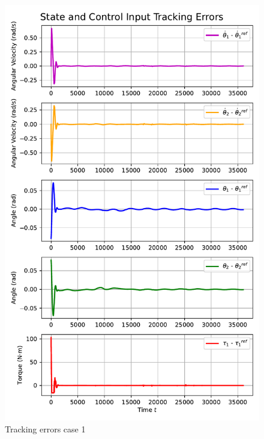 \begin{figure}[htb]
    \centering
    \includegraphics[width=1\linewidth]{img/4-task4/MPC1_errors.pdf}
    \caption{Tracking errors case 1}
    \label{fig:dtheta1-evolution}
\end{figure}

